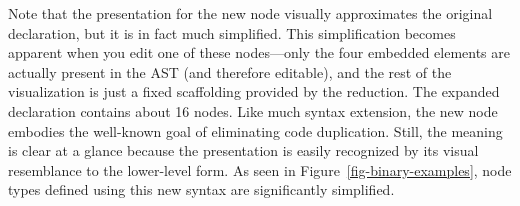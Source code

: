 Note that the presentation for the new node visually approximates the original declaration, but it is in fact much simplified. This simplification becomes apparent when you edit one of these nodes---only the four embedded elements are actually present in the AST (and therefore editable), and the rest of the visualization is just a fixed scaffolding provided by the reduction. The expanded declaration contains about 16 nodes. Like much syntax extension, the new node embodies the well-known goal of eliminating code duplication\cite{dry}. Still, the meaning is clear at a glance because the presentation is easily recognized by its visual resemblance to the lower-level form. As seen in Figure~\ref{fig-binary-examples}, node types defined using this new syntax are significantly simplified.
